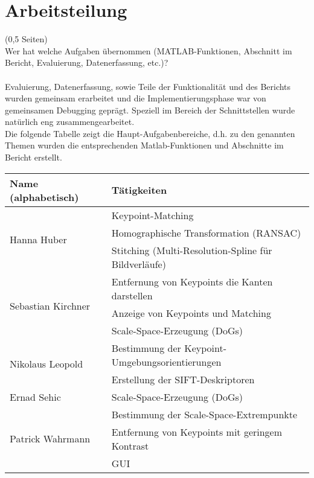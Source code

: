 \documentclass[deutsch]{scrartcl}
\begin{document}
\section{Arbeitsteilung}
(0,5 Seiten)\\
Wer hat welche Aufgaben übernommen (MATLAB-Funktionen, Abschnitt im Bericht, Evaluierung, Datenerfassung, etc.)?\\\\
Evaluierung, Datenerfassung, sowie Teile der Funktionalität und des Berichts
wurden gemeinsam erarbeitet und die Implementierungsphase war von gemeinsamen
Debugging geprägt.
Speziell im Bereich der Schnittstellen wurde natürlich eng zusammengearbeitet.\\Die folgende Tabelle zeigt die Haupt-Aufgabenbereiche, d.h. zu den genannten Themen wurden die entsprechenden Matlab-Funktionen und Abschnitte im Bericht erstellt.
\begin{center}
  \begin{tabular}{ |l|l| }
    \hline
  Name (alphabetisch) & Tätigkeiten\\
    \hline
    \multirow{3}{*}{Hanna Huber} & Keypoint-Matching \\ & Homographische Transformation (RANSAC)\\ & Stitching (Multi-Resolution-Spline für Bildverläufe)\\ \hline
    \multirow{3}{*}{Sebastian Kirchner} & Entfernung von Keypoints die Kanten darstellen\\  & Anzeige von Keypoints und Matching\\ & Scale-Space-Erzeugung (DoGs)\\\hline
    \multirow{2}{*}{Nikolaus Leopold} & Bestimmung der Keypoint-Umgebungsorientierungen\\ & Erstellung der SIFT-Deskriptoren\\ \hline
    \multirow{1}{*}{Ernad Sehic} & Scale-Space-Erzeugung (DoGs)\\ \hline
    \multirow{3}{*}{Patrick Wahrmann} & Bestimmung der Scale-Space-Extrempunkte\\ & Entfernung von Keypoints mit geringem Kontrast\\ & GUI\\ \hline
  \end{tabular}
\end{center}


\newpage
\end{document}
